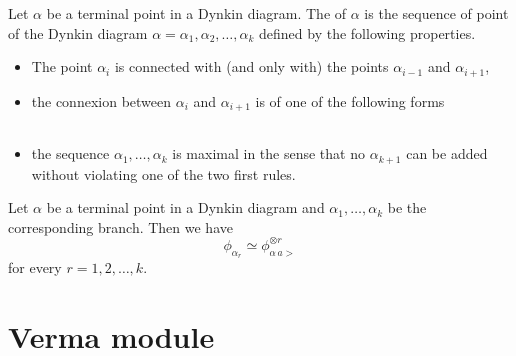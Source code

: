 Let $\alpha$ be a terminal point in a Dynkin diagram. The  of $\alpha$ is the sequence of point of the Dynkin diagram $\alpha=\alpha_1,\alpha_2,\ldots,\alpha_k$ defined by the following properties.
\begin{itemize}
    \item The point $\alpha_i$ is connected with (and only with) the points $\alpha_{i-1}$ and $\alpha_{i+1}$,
    \item the connexion between $\alpha_i$ and $\alpha_{i+1}$ is of one of the following forms
        \begin{subequations}
            \begin{align}
            \\
   \\
   
            \end{align}
        \end{subequations}
    \item the sequence $\alpha_1,\ldots,\alpha_k$ is maximal in the sense that no $\alpha_{k+1}$ can be added without violating one of the two first rules.
\end{itemize}

\begin{proposition}
    Let $\alpha$ be a terminal point in a Dynkin diagram and $\alpha_1,\ldots,\alpha_k$ be the corresponding branch. Then we have
    \begin{equation}
        \phi_{\alpha_r}\simeq \phi^{\otimes r}_{\alpha\,a>}
    \end{equation}
    for every $r=1,2,\ldots,k$.
\end{proposition}

                    \section{Verma module}

